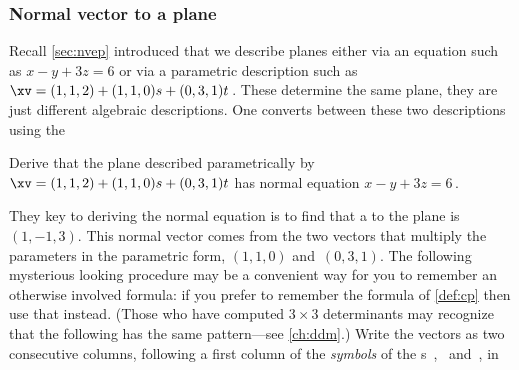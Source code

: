 \subsubsection{Normal vector to a plane}
Recall \cref{sec:nvep} introduced that we describe planes either via an equation such as \(x-y+3z=6\) or via a parametric description such as \(\xv=(1,1,2)+(1,1,0)s+(0,3,1)t\)\,.
These determine the same plane, they are just different algebraic descriptions.
One converts between these two descriptions using the 




\begin{example} \label{eg:nviax}
Derive that the plane described parametrically by \(\xv=(1,1,2)+(1,1,0)s+(0,3,1)t\) has normal equation \(x-y+3z=6\)\,.
\begin{solution} 
They key to deriving the normal equation is to find that a  to the plane is~\((1,-1,3)\).
This normal vector comes from the two vectors that multiply the parameters in the parametric form, \((1,1,0)\) and~\((0,3,1)\).
The following mysterious looking procedure may be a convenient way for you to remember an otherwise involved formula: if you prefer to remember the formula of \cref{def:cp} then use that instead.
(Those who have computed \(3\times3\) determinants may recognize that the following has the same pattern---see \cref{ch:ddm}.)
Write the vectors as two consecutive columns, following a first column of the \emph{symbols} of the s~\iv, \jv\ and~\kv, in
\setlength{\unitlength}{1.2ex}
\def\abc#1{\begin{vmatrix}\begin{picture}(5.3,6)
\put(0,4){$\iv$}\put(2,4){$1$}\put(4,4){$0$}
\put(0,2){$\jv$}\put(2,2){$1$}\put(4,2){$3$}
\put(0,0){$\kv$}\put(2,0){$0$}\put(4,0){$1$}
\ifnum1=#1\put(0.5,-0.5){\line(0,1)6}\put(-0.5,4.5){\line(1,0)6}\fi
\ifnum2=#1\put(0.5,-0.5){\line(0,1)6}\put(-0.5,2.5){\line(1,0)6}\fi
\ifnum3=#1\put(0.5,-0.5){\line(0,1)6}\put(-0.5,0.5){\line(1,0)6}\fi
\end{picture}\end{vmatrix}}
\def\ab#1#2#3#4{\begin{vmatrix}\begin{picture}(3,4)
\put(0,2){$#1$}\put(2,2){$#2$}
\put(0,0){$#3$}\put(2,0){$#4$}
\color{red}\put(-0.5,-0.5){\line(1,1)4}
\color{blue}\put(-0.5,3.5){\line(1,-1)4}
\end{picture}\end{vmatrix}}

\end{solution}
\end{example}
